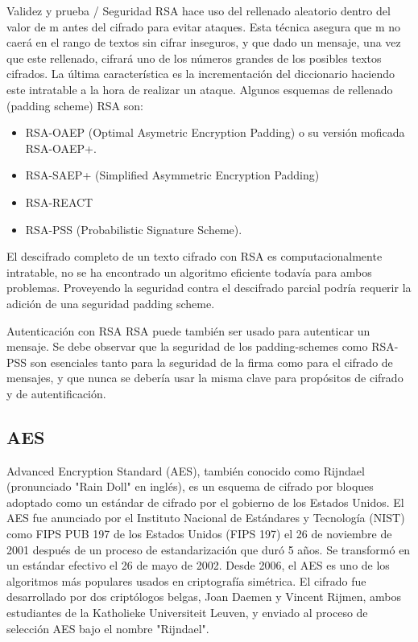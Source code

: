 \documentclass[spanish]{article}
\begin{document}
Validez y prueba / Seguridad
RSA hace uso del rellenado aleatorio dentro del valor de m antes del cifrado para evitar ataques. Esta técnica asegura que m no caerá en el rango de textos sin cifrar inseguros, y que dado un mensaje, una vez que este rellenado, cifrará uno de los números grandes de los posibles textos cifrados. La última característica es la incrementación del diccionario haciendo este intratable a la hora de realizar un ataque.
Algunos esquemas de rellenado (padding scheme) RSA son:
\begin{itemize}
\item RSA-OAEP (Optimal Asymetric Encryption Padding) o su versión moficada RSA-OAEP+.
\item RSA-SAEP+ (Simplified Asymmetric Encryption Padding)
\item RSA-REACT
\item RSA-PSS (Probabilistic Signature Scheme).
\end{itemize}

El descifrado completo de un texto cifrado con RSA es computacionalmente intratable, no se ha encontrado un algoritmo eficiente todavía para ambos problemas. Proveyendo la seguridad contra el descifrado parcial podría requerir la adición de una seguridad padding scheme.


Autenticación con RSA
RSA puede también ser usado para autenticar un mensaje. Se debe observar que la seguridad de los padding-schemes como RSA-PSS son esenciales tanto para la seguridad de la firma como para el cifrado de mensajes, y que nunca se debería usar la misma clave para propósitos de cifrado y de autentificación. 


\subsection{AES}
Advanced Encryption Standard (AES), también conocido como Rijndael (pronunciado "Rain Doll" en inglés), es un esquema de cifrado por bloques adoptado como un estándar de cifrado por el gobierno de los Estados Unidos. El AES fue anunciado por el Instituto Nacional de Estándares y Tecnología (NIST) como FIPS PUB 197 de los Estados Unidos (FIPS 197) el 26 de noviembre de 2001 después de un proceso de estandarización que duró 5 años. Se transformó en un estándar efectivo el 26 de mayo de 2002. Desde 2006, el AES es uno de los algoritmos más populares usados en criptografía simétrica.
El cifrado fue desarrollado por dos criptólogos belgas, Joan Daemen y Vincent Rijmen, ambos estudiantes de la Katholieke Universiteit Leuven, y enviado al proceso de selección AES bajo el nombre "Rijndael".\\
\end{document}
